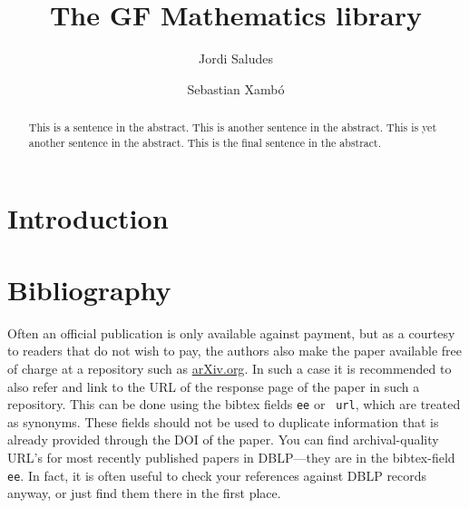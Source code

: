 \documentclass[adraft,copyright,creativecommons]{eptcs}
\title{The GF Mathematics library}
\author{Jordi Saludes
\institute{UPC}
\institute{Sistemes Avan\c cats de Control}\\
\email{jordi.saludes@upc.edu}
\and
Sebastian Xamb\'o
\institute{Universitat Polit\`ecnica de Catalunya.\\Barcelona, Spain}
\email{\quad ??}
}
\begin{document}
\maketitle

\begin{abstract}
This is a sentence in the abstract.
This is another sentence in the abstract.
This is yet another sentence in the abstract.
This is the final sentence in the abstract.
\end{abstract}

\section{Introduction}




\section{Bibliography}

Often an official publication is only available against payment, but
as a courtesy to readers that do not wish to pay, the authors also
make the paper available free of charge at a repository such as
\url{arXiv.org}. In such a case it is recommended to also refer and
link to the URL of the response page of the paper in such a
repository.  This can be done using the bibtex fields {\tt ee} or {\tt
url}, which are treated as synonyms.  These fields should not be used
to duplicate information that is already provided through the DOI of
the paper.
You can find archival-quality URL's for most recently published papers
in DBLP---they are in the bibtex-field {\tt ee}. In fact, it is often
useful to check your references against DBLP records anyway, or just find
them there in the first place.


\nocite{*}


\end{document}
